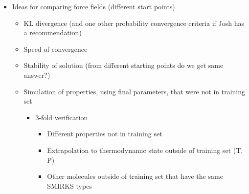 \documentclass[aps,pre,nofootinbib,superscriptaddress,linenumbers,10pt, draft,tightenlines]{revtex4-1}
\begin{document}
\begin{itemize}
    \item Ideas for comparing force fields (different start points) 
    \begin{itemize}
    	\item KL divergence (and one other probability convergence criteria if Josh has a recommendation)
    	\item Speed of convergence
    	\item Stability of solution (from different starting points do we get same answer?) 
    	\item Simulation of properties, using final parameters, that 
    	      were not in training set
    	\begin{itemize}
    		\item 3-fold verification
    		\begin{itemize}
    			\item Different properties not in training set
    			\item Extrapolation to thermodynamic state outside of training set (T, P)
    			\item Other molecules outside of training set that have the same SMIRKS types
    		\end{itemize}    		
    	\end{itemize} 
    \end{itemize}
\end{itemize}

 

\end{document}
